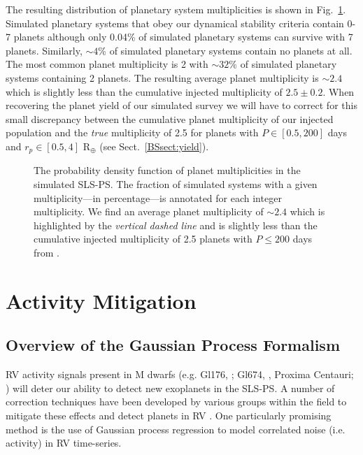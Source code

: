 The resulting distribution of planetary system multiplicities is shown in Fig.~\ref{BSfig:mult}.
Simulated planetary systems that obey our dynamical stability criteria contain 0-7 planets although only 0.04\%
of simulated planetary systems can survive with 7 planets. Similarly, $\sim 4$\% of simulated planetary systems contain
no planets at all. 
The most common planet multiplicity is 2 with $\sim 32$\% of simulated planetary systems containing 2 planets. The resulting
average planet multiplicity is $\sim 2.4$ which is slightly less than the cumulative injected multiplicity of
$2.5 \pm 0.2$. When
recovering the planet yield of our simulated survey we will have to correct for this small discrepancy between the
cumulative planet multiplicity of our injected population and the \emph{true} multiplicity of 2.5 for planets
with $P \in [0.5,200]$ days and $r_p \in [0.5,4]$ R$_{\oplus}$ (see Sect.~\ref{BSsect:yield}).

\begin{figure}
  \centering
  \caption{The probability density function of planet multiplicities in the simulated SLS-PS.
    The fraction of simulated systems with a given multiplicity---in percentage---is annotated for
    each integer multiplicity. We find an average planet multiplicity of $\sim 2.4$ which is highlighted by the
    \emph{vertical dashed line} and is slightly less than the cumulative injected multiplicity of 2.5 planets
    with $P\leq 200$ days from \cite{dressing15a}.}
  \label{BSfig:mult}
\end{figure}


\section{Activity Mitigation} \label{BSsect:GP}
\subsection{Overview of the Gaussian Process Formalism}
RV activity signals present in M dwarfs (e.g. Gl176, \citealt{forveille09}; Gl674, \citealt{bonfils07},
Proxima Centauri; \citealt{robertson16}) will deter our ability to detect new exoplanets in the SLS-PS.
A number of correction techniques have been developed by various groups
within the field to mitigate these effects and detect planets in RV \citep[see reviews in][]{fischer16, dumusque17}.
One particularly promising method is the use of Gaussian process regression to model correlated noise (i.e. activity)
in RV time-series.

